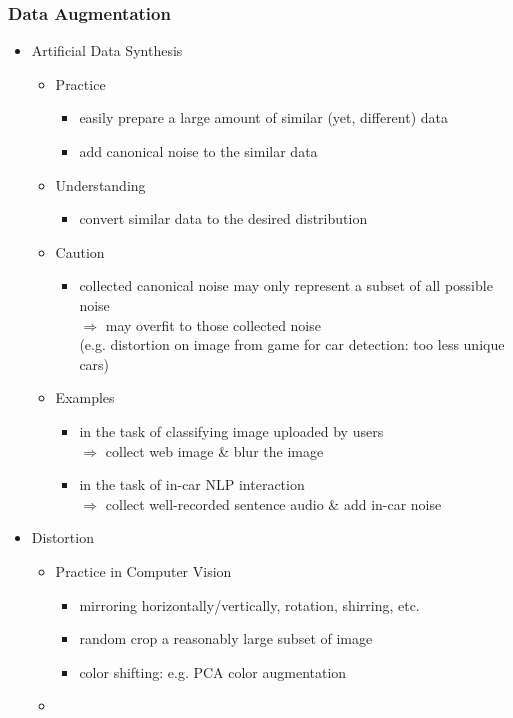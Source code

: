 \subsubsection{Data Augmentation}
\begin{itemize}
\item Artificial Data Synthesis
	\begin{itemize}
	\item Practice
		\begin{itemize}
		\item easily prepare a large amount of similar (yet, different) data
		\item add canonical noise to the similar data
		\end{itemize}
	\item Understanding
		\begin{itemize}
		\item convert similar data to the desired distribution
		\end{itemize}
	\item Caution
		\begin{itemize}
		\item collected canonical noise may only represent a subset of all possible noise \\
		$\Rightarrow$ may overfit to those collected noise \\
		(e.g. distortion on image from game for car detection: too less unique cars)
		\end{itemize}
	\item Examples
		\begin{itemize}
		\item in the task of classifying image uploaded by users \\ 
		$\Rightarrow$ collect web image \& blur the image
		\item in the task of in-car NLP interaction \\
		$\Rightarrow$ collect well-recorded sentence audio \& add in-car noise
		\end{itemize}
	\end{itemize}
	
\item Distortion
	\begin{itemize}
	\item Practice in Computer Vision
		\begin{itemize}
		\item mirroring horizontally/vertically, rotation, shirring, etc.
		\item random crop a reasonably large subset of image
		\item color shifting: e.g. PCA color augmentation
		\end{itemize}
	\item 
	\end{itemize}
\end{itemize}

